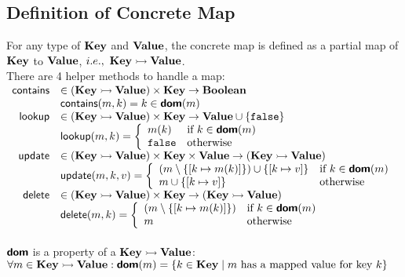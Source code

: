 \subsection{Definition of Concrete Map}
For any type of $\textbf{Key}$ and $\textbf{Value}$,
the concrete map is defined as a partial map of $\textbf{Key}$ to $\textbf{Value}$,
$i.e., ~ \textbf{Key} \rightarrowtail \textbf{Value}$.\\
There are 4 helper methods to handle a map:\\

$\begin{array}{rl}
\textsf{contains} & \in (\textbf{Key} \rightarrowtail \textbf{Value}) \times \textbf{Key} \rightarrow \textbf{Boolean} \\
& \textsf{contains}(m, k) = k \in \textsf{\textbf{dom}}(m) \\
\textsf{lookup} & \in (\textbf{Key} \rightarrowtail \textbf{Value}) \times \textbf{Key} \rightarrow \textbf{Value} \cup \{ \texttt{false} \}\\
& \textsf{lookup}(m, k) = \left \{ \begin{array}{ll}
m(k) & \textrm{if } k \in \textsf{\textbf{dom}}(m) \\
\texttt{false} & \textrm{otherwise} \\
\end{array} \right. \\
\textsf{update} & \in (\textbf{Key} \rightarrowtail \textbf{Value}) \times \textbf{Key} \times \textbf{Value} \rightarrow (\textbf{Key} \rightarrowtail \textbf{Value}) \\
& \textsf{update}(m, k, v) = \left \{ \begin{array}{ll}
(m \setminus \{ [k \mapsto m(k)] \}) \cup \{ [k \mapsto v] \} & \textrm{if } k \in \textsf{\textbf{dom}}(m) \\
m \cup \{ [k \mapsto v] \} & \textrm {otherwise} \\
\end{array} \right.\\
\textsf{delete} & \in (\textbf{Key} \rightarrowtail \textbf{Value}) \times \textbf{Key} \rightarrow (\textbf{Key} \rightarrowtail \textbf{Value}) \\
& \textsf{delete}(m, k) = \left \{ \begin{array}{ll}
(m \setminus \{ [k \mapsto m(k)] \}) & \textrm{if } k \in \textsf{\textbf{dom}}(m) \\
m & \textrm{otherwise} \\
\end{array} \right. \\
\end{array}$\\\\
$\textsf{\textbf{dom}}$ is a property of a $\textbf{Key} \rightarrowtail \textbf{Value}$:\\

$\forall m \in \textbf{Key} \rightarrowtail \textbf{Value}:
\textsf{\textbf{dom}}(m) = \{ k \in \textbf{Key} \mid 
m \textrm{ has a mapped value for key } k \}$
